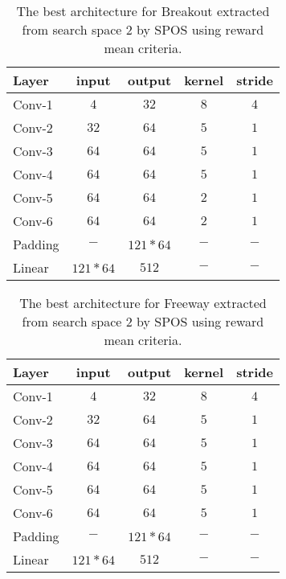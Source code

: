 \documentclass{svproc}
\begin{document}
\begin{appendix}
\begin{table}[!h]
\begin{center}
\begin{tabularx}{0.5\textwidth}{@{}lcccc@{}}
    \hline
    \textbf{Layer} & \textbf{input} & \textbf{output} & \textbf{kernel} & \textbf{stride}\\
    \hline
        Conv-1 & $4$ & $32$ & $8$ & $4$         \\
        Conv-2 & $32$ & $64$ & $5$ & $1$        \\
        Conv-3 & $64$ & $64$ & $5$ & $1$        \\
        Conv-4 & $64$ & $64$ & $5$ & $1$        \\
        Conv-5 & $64$ & $64$ & $2$ & $1$        \\
        Conv-6 & $64$ & $64$ & $2$ & $1$        \\
        Padding & $-$ & $121*64$ & $-$ & $-$    \\        
        Linear & $121*64$ & $512$ & $-$ & $-$   \\
    \hline
\end{tabularx}
\caption{The best architecture for Breakout extracted from search space 2 by SPOS using reward mean criteria.}\label{tab:best-3}
\end{center}
\end{table}

\begin{table}[!h]
\begin{center}
\begin{tabularx}{0.5\textwidth}{@{}lcccc@{}}
    \hline
    \textbf{Layer} & \textbf{input} & \textbf{output} & \textbf{kernel} & \textbf{stride}\\
    \hline
        Conv-1 & $4$ & $32$ & $8$ & $4$         \\
        Conv-2 & $32$ & $64$ & $5$ & $1$        \\
        Conv-3 & $64$ & $64$ & $5$ & $1$        \\
        Conv-4 & $64$ & $64$ & $5$ & $1$        \\
        Conv-5 & $64$ & $64$ & $5$ & $1$        \\
        Conv-6 & $64$ & $64$ & $5$ & $1$        \\
        Padding & $-$ & $121*64$ & $-$ & $-$    \\        
        Linear & $121*64$ & $512$ & $-$ & $-$   \\
    \hline
\end{tabularx}
\caption{The best architecture for Freeway extracted from search space 2 by SPOS using reward mean criteria.\\
}\label{tab:best-4}
\end{center}
\end{table}


\end{appendix}
\end{document}
